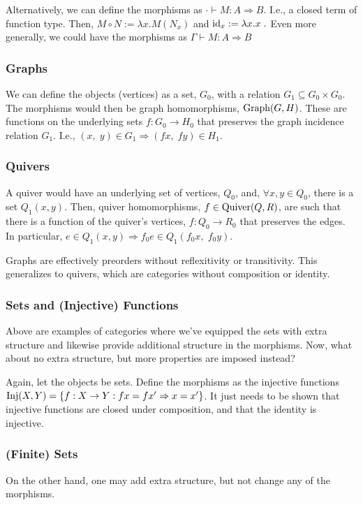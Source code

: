 \documentclass[12pt]{article}
\begin{document}
Alternatively, we can define the morphisms as $\cdot \vdash M: A \Rightarrow B$. I.e., a closed term of function type. Then, $M \circ N := \lambda x . M(N_x)$ and $\textmd{id}_x := \lambda x . x\;.$ Even more generally, we could have the morphisms as $\Gamma \vdash M : A \Rightarrow B$

\subsubsection{Graphs}
We can define the objects (vertices) as a set, $G_0$, with a relation $G_1 \subseteq G_0 \times G_0$. The morphisms would then be graph homomorphisms, $\textmd{Graph}(G,H)$. These are functions on the underlying sets $f:G_0 \rightarrow H_0$ that preserves the graph incidence relation $G_1$. I.e., $(x,\;y) \in G_1 \Rightarrow (fx,\;fy) \in H_1$.

\subsubsection{Quivers}
A quiver would have an underlying set of vertices, $Q_0$, and, $\forall x,y \in Q_0$, there is a set $Q_1(x,y)$. Then, quiver homomorphisms, $f \in \textmd{Quiver}(Q,R)$, are such that there is a function of the quiver's vertices, $f: Q_0 \rightarrow R_0$ that preserves the edges. In particular, $e \in Q_1(x,y) \Rightarrow f_0e \in Q_1(f_0x,\;f_0y)$.

Graphs are effectively preorders without reflexitivity or transitivity. This generalizes to quivers, which are categories without composition or identity.

\subsubsection{Sets and (Injective) Functions}
Above are examples of categories where we've equipped the sets with extra structure and likewise provide additional structure in the morphisms. Now, what about no extra structure, but more properties are imposed instead?

Again, let the objects be sets. Define the morphisms as the injective functions $\textmd{Inj}(X,Y) = \{f: X \rightarrow Y : fx = fx' \Rightarrow x = x'\}$. It just needs to be shown that injective functions are closed under composition, and that the identity is injective.

\subsubsection{(Finite) Sets}
On the other hand, one may add extra structure, but not change any of the morphisms.
\end{document}
